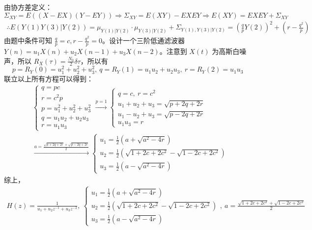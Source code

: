 由协方差定义：$\Sigma_{XY}=E((X-EX)(Y-EY))\Rightarrow\Sigma_{XY}=E(XY)-EXEY\Rightarrow E(XY)=EXEY+\Sigma_{XY}$
\begin{equation}\tag*{}
\begin{split}
\therefore E(Y(1)Y(3)|Y(2))=\mu_{Y(1)|Y(2)}\cdot\mu_{Y(3)|Y(2)}+\Sigma_{Y(1), Y(3)|Y(2)}=\left(\frac{q}{p}Y(2)\right)^2+\left(r-\frac{q^2}{p}\right)
\end{split}
\end{equation}
由题中条件可知 $\frac{q}{p}=c, r-\frac{q^2}{p}=0$。设计一个三阶低通滤波器 $Y(n)=u_1X(n)+u_2X(n-1)+u_3X(n-2)$。注意到 $X(t)$ 为高斯白噪声，所以 $R_X(\tau)=\frac{N_0}{2}\delta{\tau}$，所以有
$$
p=R_Y(0)=u_1^2+u_2^2+u_3^2,\ q=R_Y(1)=u_1u_2+u_2u_3,\ r=R_Y(2)=u_1u_3
$$
联立以上所有方程可以得到：
\begin{equation}\tag*{}
\begin{split}&
\begin{cases}
q=pc\\r=c^2p\\p=u_1^2+u_2^2+u_3^2\\q=u_1u_2+u_2u_3\\r=u_1u_3
\end{cases}
\xrightarrow{p=1}
\begin{cases}
q=c,\ r=c^2\\u_1+u_2+u_3=\sqrt{p+2q+2r}\\u_1-u_2+u_3=\sqrt{p-2q+2r}\\u_1u_3=r
\end{cases}\\
&\xrightarrow{a=\frac{\sqrt{p+2q+2r}+\sqrt{p-2q+2r}}{2}}
\begin{cases}
u_1=\frac{1}{2}(a+\sqrt{a^2-4r})\\u_2=\frac{1}{2}(\sqrt{1+2c+2c^2}-\sqrt{1-2c+2c^2})\\u_3=\frac{1}{2}(a-\sqrt{a^2-4r})
\end{cases}
\end{split}
\end{equation}
综上，
\begin{equation}\tag*{}
\begin{split}
H(z)=\frac{1}{u_1+u_2z^{-1}+u_3z^{-2}}, \ \begin{cases}
u_1=\frac{1}{2}(a+\sqrt{a^2-4r})\\u_2=\frac{1}{2}(\sqrt{1+2c+2c^2}-\sqrt{1-2c+2c^2})\\u_3=\frac{1}{2}(a-\sqrt{a^2-4r})
\end{cases},\ a=\frac{\sqrt{1+2c+2c^2}+\sqrt{1-2c+2c^2}}{2}
\end{split}
\end{equation}

